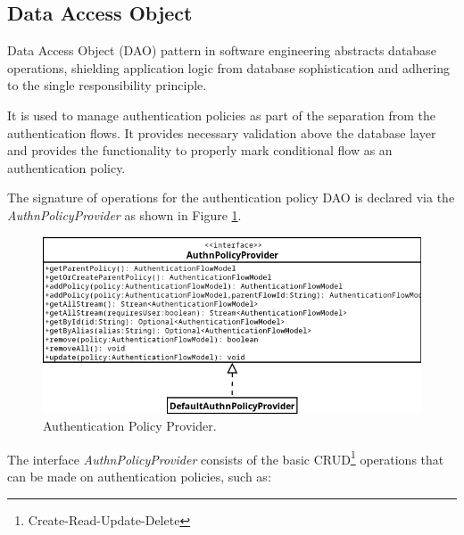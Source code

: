 \subsection{Data Access Object} \label{impl-authn-policies-dao}
Data Access Object (DAO) pattern in software engineering abstracts database operations, shielding application logic from database sophistication and adhering to the single responsibility principle.\cite{impl-dao}

It is used to manage authentication policies as part of the separation from the authentication flows.
It provides necessary validation above the database layer and provides the functionality to properly mark conditional flow as an authentication policy.

The signature of operations for the authentication policy DAO is declared via the \textit{AuthnPolicyProvider} as shown in Figure \ref{fig:impl-authn-policies-provider-diagram}.

\begin{figure}[htbp]
  \centering
  \includegraphics[width=1\textwidth]{img/sections/6-implementation/authn-policy-provider-diagram.png}
  \caption{Authentication Policy Provider.}
  \label{fig:impl-authn-policies-provider-diagram}
\end{figure}

\newpage

The interface \textit{AuthnPolicyProvider} consists of the basic CRUD\footnote{Create-Read-Update-Delete} operations that can be made on authentication policies, such as:

